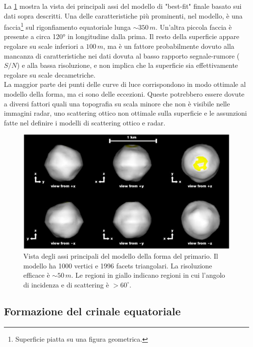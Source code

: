 \documentclass[a4paper,11pt,openright]{book}
\begin{document}
La \cref{fig:didymos_shape_model} mostra la vista dei principali assi del modello di "best-fit" finale basato sui dati sopra descritti. Una delle caratteristiche più prominenti, nel modello, è una faccia\footnote{Superficie piatta su una figura geometrica.} sul rigonfiamento equatoriale lunga $\sim 350\,m$. Un'altra piccola faccia è presente a circa 120° in longitudine dalla prima. Il resto della superficie appare regolare su scale inferiori a $100\,m$, ma è un fattore probabilmente dovuto alla mancanza di caratteristiche nei dati dovuta al basso rapporto segnale-rumore ($S/N$) e alla bassa risoluzione, e non implica che la superficie sia effettivamente regolare su scale decametriche.\\
La maggior parte dei punti delle curve di luce corrispondono in modo ottimale al modello della forma, ma ci sono delle eccezioni. Queste potrebbero essere dovute a diversi fattori quali una topografia su scala minore che non è visibile nelle immagini radar, uno scattering ottico non ottimale sulla superficie e le assunzioni fatte nel definire i modelli di scattering ottico e radar.

\begin{figure}
    \centering
    \includegraphics[scale=0.78]{figure/didymos_shape_model.jpg}
    \caption[Vista degli assi principali del modello della forma del primario.]{Vista degli assi principali del modello della forma del primario. Il modello ha 1000 vertici e 1996 facets triangolari. La risoluzione efficace è $\sim 50\,m$. Le regioni in giallo indicano regioni in cui l'angolo di incidenza e di scattering è $>60^\circ$. \citep{naidu_radar_2020}}
    \label{fig:didymos_shape_model}
\end{figure}

\subsection{Formazione del crinale equatoriale}\label{sec:eq_ridge}
\end{document}
